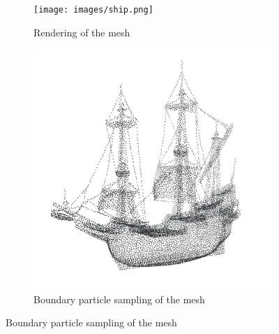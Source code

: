 \documentclass[oneside, a4paper]{book}
\begin{document}
    \begin{figure}
      \centering
      \begin{subfigure}[t][0.5\textwidth]{0.5\textwidth}
        \texttt{[image: images/ship.png]}
        \caption{Rendering of the mesh}
        \label{fig:ship-sample-a}
      \end{subfigure}%
      \begin{subfigure}[t][0.5\textwidth]{0.5\textwidth}
        \includegraphics[width=\textwidth]{images/ship_sample_inv.png}
        \caption{Boundary particle sampling of the mesh}
        \label{fig:ship-sample-b}
      \end{subfigure}\vspace{1cm}




\end{figure}
\end{document}
